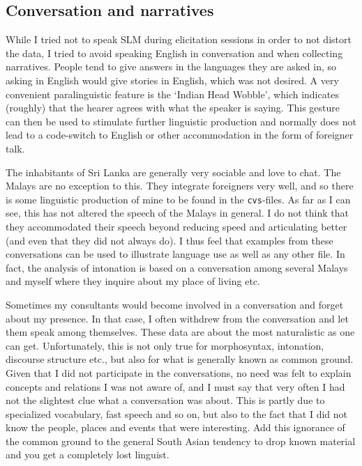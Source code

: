 \subsection{Conversation and narratives}
While I tried not to speak SLM during elicitation sessions in order to not distort the data, I tried to avoid speaking English in conversation and when collecting narratives. People tend to give answers in the languages they are asked in, so asking in English would give stories in English, which was not desired. A very convenient paralinguistic feature is the `Indian Head Wobble', which indicates (roughly) that the hearer agrees with what the speaker is saying. This gesture can then be used to stimulate further linguistic production and normally does not lead to a code-switch to English or other accommodation in the form of foreigner talk.

The inhabitants of Sri Lanka are generally very sociable and love to chat. The Malays are no exception to this. They integrate foreigners very well, and so there is some linguistic production of mine to be found in the \texttt{cvs}-files. As far as I can see, this has not altered the speech of the Malays in general. I do not think that they accommodated their speech beyond reducing speed and articulating better (and even that they did not always do). I thus feel that examples from these conversations can be used to illustrate language use as well as any other file. In fact, the analysis of intonation is based on a conversation among several Malays and myself where they inquire about my place of living etc.

Sometimes my consultants would become involved in a conversation and forget about my pre\-sence. In that case, I often withdrew from the conversation and let them speak among themselves. These data are about the most naturalistic as one can get. Unfortunately, this is not only true for morphosyntax, intonation, discourse structure etc., but also for what is generally known as common ground. Given that I did not participate in the conversations, no need was felt to explain concepts and relations I was not aware of, and I must say that very often I had not the slightest clue what a conversation was about. This is partly due to specialized vocabulary, fast speech and so on, but also to the fact that I did not know the people, places and events that were interesting. Add this ignorance of the common ground to the general South Asian tendency to drop known material and you get a completely lost linguist.



